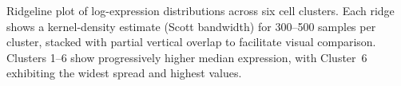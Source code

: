 \caption{Ridgeline plot of log-expression distributions across six cell clusters. Each ridge shows a kernel-density estimate (Scott bandwidth) for 300--500 samples per cluster, stacked with partial vertical overlap to facilitate visual comparison. Clusters 1--6 show progressively higher median expression, with Cluster~6 exhibiting the widest spread and highest values.}
